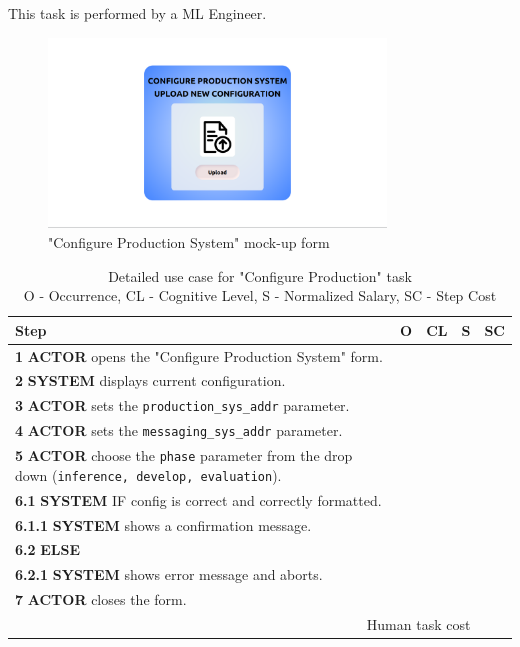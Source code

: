 This task is performed by a ML Engineer.

\begin{figure}[H]
\centering
\includegraphics[width=0.8\textwidth]{figures/ui_configure_production.png}
\caption{"Configure Production System" mock-up form}
\end{figure}

\begin{table}[H]
    \centering
    \begin{tabularx}{\textwidth}{|X|c|c|c|c|}
    \hline
    \textbf{Step} & \textbf{O} & \textbf{CL} & \textbf{S} & \textbf{SC} \\
    \hline
    \textbf{1} \textbf{ACTOR} opens the "Configure Production System" form. & & & & \\
    \hline
    \textbf{2} \textbf{SYSTEM} displays current configuration. & & & & \\
    \hline
    \textbf{3} \textbf{ACTOR} sets the \texttt{production\_sys\_addr} parameter. & & & & \\
    \hline
    \textbf{4} \textbf{ACTOR} sets the \texttt{messaging\_sys\_addr} parameter. & & & & \\
    \hline
    \textbf{5} \textbf{ACTOR} choose the \texttt{phase} parameter from the drop down (\texttt{inference, develop, evaluation}). & & & & \\
    \hline
    \textbf{6.1} \textbf{SYSTEM} IF config is correct and correctly formatted. & & & & \\
    \hline
    \textbf{6.1.1} \textbf{SYSTEM} shows a confirmation message. & & & & \\
    \hline
    \textbf{6.2} \textbf{ELSE} & & & & \\
    \hline
    \textbf{6.2.1} \textbf{SYSTEM} shows error message and aborts. & & & & \\
    \hline
    \textbf{7} \textbf{ACTOR} closes the form. & & & & \\
    \hline
    \multicolumn{4}{|r|}{Human task cost} & \\
    \hline
    \end{tabularx}
    
    \caption{Detailed use case for "Configure Production" task\\ 
    O - Occurrence, CL - Cognitive Level, S - Normalized Salary, SC - Step Cost}
    \label{table:configure_production_system}
    \end{table}



